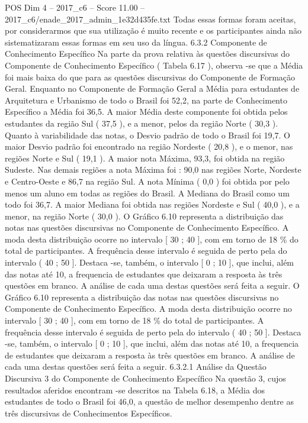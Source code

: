 \begin{textsample}{POS Dim 4 – 2017\_c6 – Score 11.00 – 2017\_c6/enade\_2017\_admin\_1e32d435fe.txt}
Todas essas formas foram aceitas, por considerarmos que sua utilização é muito recente e os participantes ainda não sistematizaram essas formas em seu uso da língua. 6.3.2 Componente de Conhecimento Específico Na parte da prova relativa às questões discursivas do Componente de Conhecimento Específico ( Tabela 6.17 ), observa -se que a Média foi mais baixa do que para as questões discursivas do Componente de Formação Geral.
Enquanto no Componente de Formação Geral a Média para estudantes de Arquitetura e Urbanismo de todo o Brasil foi 52,2, na parte de Conhecimento Específico a Média foi 36,5.
A maior Média deste componente foi obtida pelos estudantes da região Sul ( 37,5 ), e a menor, pelos da região Norte ( 30,3 ).
Quanto à variabilidade das notas, o Desvio padrão de todo o Brasil foi 19,7.
O maior Desvio padrão foi encontrado na região Nordeste ( 20,8 ), e o menor, nas regiões Norte e Sul ( 19,1 ).
A maior nota Máxima, 93,3, foi obtida na região Sudeste.
Nas demais regiões a nota Máxima foi : 90,0 nas regiões Norte, Nordeste e Centro-Oeste e 86,7 na região Sul.
A nota Mínima ( 0,0 ) foi obtida por pelo menos um aluno em todas as regiões do Brasil.
A Mediana do Brasil como um todo foi 36,7.
A maior Mediana foi obtida nas regiões Nordeste e Sul ( 40,0 ), e a menor, na região Norte ( 30,0 ).
O Gráfico 6.10 representa a distribuição das notas nas questões discursivas no Componente de Conhecimento Específico.
A moda desta distribuição ocorre no intervalo [ 30 ; 40 ], com em torno de 18 \% do total de participantes.
A frequência desse intervalo é seguida de perto pela do intervalo ( 40 ; 50 ].
Destaca -se, também, o intervalo [ 0 ; 10 ], que inclui, além das notas até 10, a frequencia de estudantes que deixaram a resposta às três questões em branco.
A análise de cada uma destas questões será feita a seguir.
O Gráfico 6.10 representa a distribuição das notas nas questões discursivas no Componente de Conhecimento Específico.
A moda desta distribuição ocorre no intervalo [ 30 ; 40 ], com em torno de 18 \% do total de participantes.
A frequência desse intervalo é seguida de perto pela do intervalo ( 40 ; 50 ].
Destaca -se, também, o intervalo [ 0 ; 10 ], que inclui, além das notas até 10, a frequencia de estudantes que deixaram a resposta às três questões em branco.
A análise de cada uma destas questões será feita a seguir. 6.3.2.1 Análise da Questão Discursiva 3 do Componente de Conhecimento Específico Na questão 3, cujos resultados aferidos encontram -se descritos na Tabela 6.18, a Média dos estudantes de todo o Brasil foi 46,0, a questão de melhor desempenho dentre as três discursivas de Conhecimentos Específicos.

\end{textsample}
